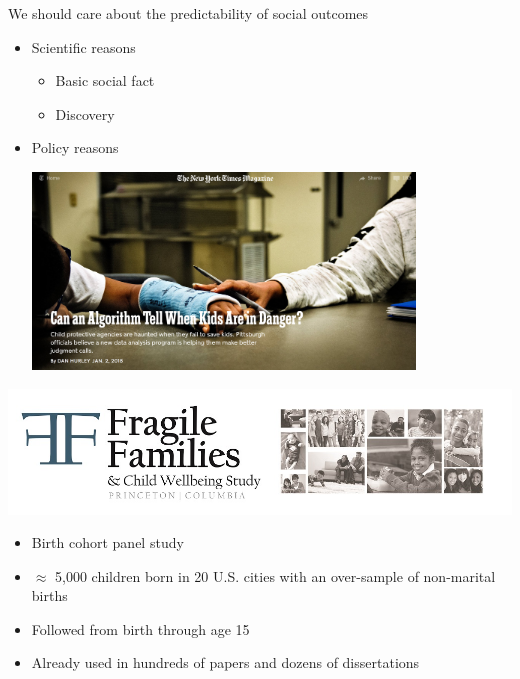 \documentclass[aspectratio=169]{beamer}
\begin{document}
\begin{frame}

We should care about the predictability of social outcomes\pause
\begin{itemize}
\item Scientific reasons \pause
\begin{itemize}
\item Basic social fact \pause
\item Discovery \pause
\end{itemize}
\item Policy reasons
\begin{center}
\includegraphics[width=0.8\textwidth]{figures/hurley_can_2018_title} 
\end{center}
\end{itemize}

\end{frame}
\begin{frame}

\begin{center}
\includegraphics[width=\textwidth]{figures/ff_logo}
\end{center}

\begin{itemize}
\item Birth cohort panel study
\item $\approx$ 5,000 children born in 20 U.S. cities with an over-sample of non-marital births
\item Followed from birth through age 15
\item Already used in hundreds of papers and dozens of dissertations
\end{itemize}

\end{frame}
\end{document}
